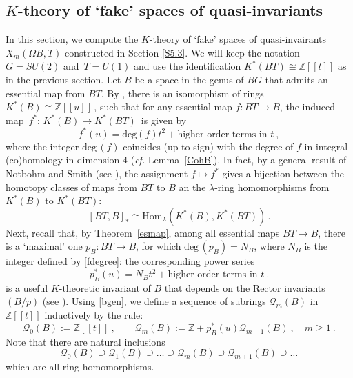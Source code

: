 \documentclass[11pt]{amsart}
\theoremstyle{definition}
\theoremstyle{remark}
\numberwithin{equation}{section}
\newcommand{\la}{\label}
\def\deg{\mathrm{deg}\,}
\def\cQ{\mathcal{Q}}
\def\Z{\mathbb{Z}}
\def\Hom{\mathrm{Hom}}
\begin{document}
\subsection{$K$-theory of `fake' spaces of quasi-invariants}
\la{S6.3}
In this section, we compute the $K$-theory of `fake' spaces of quasi-invairants $X_m(\Omega B, T)$ constructed in Section \ref{S5.3}. We will keep the notation $ G = SU(2) $ and $\, T = U(1) $ and use the identification $ K^*(BT) \cong \Z[[t]] $ as in the previous section. Let $B$ be a space in the genus of $BG$ that admits an essential map from $BT$. By \cite[Proposition 2.1]{DY01}, there is an isomorphism of rings $ K^{\ast}(B) \cong \Z[[u]]\,$, such that 
for any essential map $f: BT \to B$, the induced map $\,f^{\ast}:\,K^{\ast}(B) \to K^{\ast}(BT)\,$ is given by
%
$$
f^{\ast}(u) = \mathrm{deg}(f) t^2 + \text{higher order terms in } t\ ,
$$
%
where the integer $ \deg(f)$ coincides (up to sign) with the degree of $f$ in integral (co)homology in dimension $4$ ({\it cf.} Lemma~\ref{CohB}). In fact, by a general result of Notbohm and Smith (see \cite[Theorem 5.2]{NS90}), the assignment $ f \mapsto f^* $ 
gives a bijection between the homotopy classes of maps from $BT$ to $B$ an the 
$\lambda$-ring homomorphisms from $K^{\ast}(B)$ to $K^{\ast}(BT)$:
%
$$
[BT, B]_* \cong \Hom_{\lambda}(K^{\ast}(B), K^{\ast}(BT))\,.
$$
%
Next, recall that, by Theorem~\ref{esmap}, among all essential maps $ BT \to B $,
there is a `maximal' one $ p_B: BT \to B $, for which $\deg(p_B) = N_B$, where $N_B$ is
the integer defined by \eqref{fdegree}: the corresponding power series
%
\begin{equation} 
\la{bgen} 
p_B^{\ast}(u) = N_B t^2+ \text{higher order terms in } t\ . 
\end{equation}
%
is a useful $K$-theoretic invariant of $B$ that depends on the Rector invariants $(B/p)$ (see \cite{DY01}).
Using \eqref{bgen}, we define a sequence of subrings $ \cQ_m(B) $ in $ \Z[[t]]$ inductively by the rule:
%
\begin{equation}\la{ringB}
\cQ_{0}(B) := \Z[[t]]\ ,\qquad \cQ_{m}(B) := \Z + p_B^{\ast}(u) \cQ_{m-1}(B)
\ ,\quad m \ge 1 \ .
\end{equation}
%
Note that there are natural inclusions 
%
\begin{equation*}
\la{natin}
\cQ_{0}(B) \supseteq \cQ_1(B) \supseteq \ldots \supseteq \cQ_m(B) \supseteq \cQ_{m+1}(B) \supseteq \ldots
\end{equation*}
%
which are all ring homomorphisms. 
\end{document}
